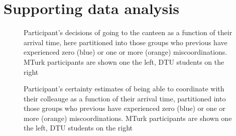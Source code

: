 \documentclass[a4paper,superscriptaddress,nofootinbib]{revtex4}
\begin{document}
\section*{Supporting data analysis}
\begin{figure} %
\hfill
{}\hfill
\caption{Participant's decisions of going to the canteen as a function of their arrival time, here partitioned into those groups who previous have experienced zero (blue) or one or more (orange) miscoordinations. MTurk participants are shown one the left, DTU students on the right}\label{fig:miscoordinations}
\caption{Participant's certainty estimates of being able to coordinate with their colleauge as a function of their arrival time, partitioned into those groups who previous have experienced zero (blue) or one or more (orange) miscoordinations. MTurk participants are shown one the left, DTU students on the right}\label{fig:certainties}
\end{figure} 
\end{document}
